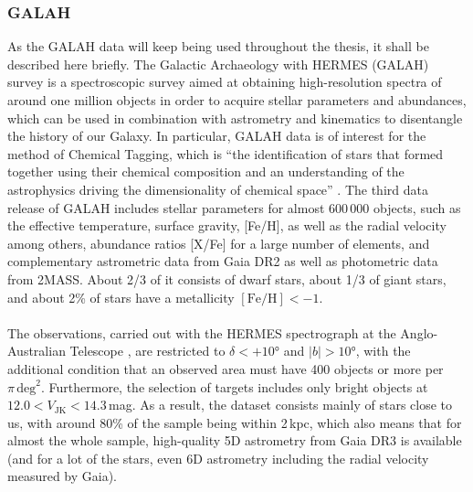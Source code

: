 \documentclass[a4paper,11pt]{article}
\begin{document}
\subsubsection*{GALAH}
As the GALAH data will keep being used throughout the thesis, it shall be described here briefly. The Galactic Archaeology with HERMES (GALAH) survey \citep{galah,galahdr3} is a spectroscopic survey aimed at obtaining high-resolution spectra of around one million objects in order to acquire stellar parameters and abundances, which can be used in combination with astrometry and kinematics to disentangle the history of our Galaxy. In particular, GALAH data is of interest for the method of Chemical Tagging, which is “the identification of stars that formed together using their chemical composition and an understanding of the astrophysics driving the dimensionality of chemical space” \citep[][p. 151]{galahdr3}. The third data release of GALAH includes stellar parameters for almost 600\,000 objects, such as the effective temperature, surface gravity, [Fe/H], as well as the radial velocity among others, abundance ratios [X/Fe] for a large number of elements, and complementary astrometric data from Gaia DR2 as well as photometric data from 2MASS. About 2/3 of it consists of dwarf stars, about 1/3 of giant stars, and about 2\% of stars have a metallicity $\mathrm{[Fe/H]}<-1$.\\ \\
%
The observations, carried out with the HERMES spectrograph at the Anglo-Australian Telescope \citep{sheinis15}, are restricted to $\delta<+10$° and $|b|>10$°, with the additional condition that an observed area must have 400 objects or more per $\pi\,\mathrm{deg}^2$. Furthermore, the selection of targets includes only bright objects at $12.0<V_\mathrm{JK}<14.3$\,mag. As a result, the dataset consists mainly of stars close to us, with around 80\% of the sample being within 2\,kpc, which also means that for almost the whole sample, high-quality 5D astrometry from Gaia DR3 is available (and for a lot of the stars, even 6D astrometry including the radial velocity measured by Gaia).\\ \\
%
\end{document}
